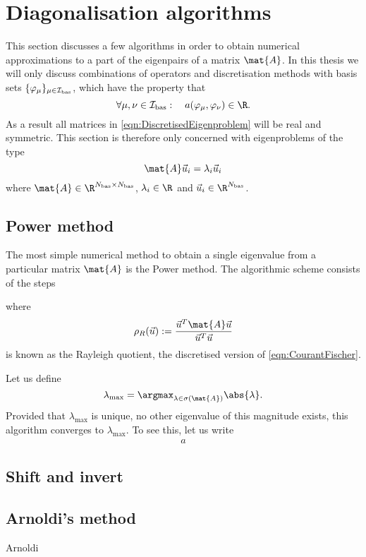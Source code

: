 \section{Diagonalisation algorithms}
\label{sec:DiagAlgos}

This section discusses a few algorithms in order to obtain
numerical approximations to a part of the eigenpairs of a matrix $\mat{A}$.
In this thesis we will only discuss combinations of operators
and discretisation methods with basis sets
$\{\varphi_\mu\}_{\mu \in \mathcal{I}_\text{bas}}$, which have the property that
\[ \forall \mu, \nu \in \Ibas: \quad a(\varphi_\mu, \varphi_\nu) \in \R. \]
As a result all matrices in \eqref{eqn:DiscretisedEigenproblem}
will be real and symmetric.
This section is therefore only concerned with eigenproblems of the type
\[ \mat{A} \vec{u}_i = \lambda_i \vec{u}_i \]
where $\mat{A} \in \R^{\Nbas \times \Nbas}$,
$\lambda_i \in \R$ and $\vec{u}_i \in \R^{\Nbas}$.

\subsection{Power method}
The most simple numerical method to obtain
a single eigenvalue from a particular matrix $\mat{A}$
is the Power method.
The algorithmic scheme consists of the steps


where
\[ \rho_R(\vec{u}) := \frac{\vec{u}^T \mat{A} \vec{u}}{\vec{u}^T \vec{u}} \]
is known as the Rayleigh quotient,
the discretised version of \eqref{eqn:CourantFischer}.

Let us define
\[ \lambda_\text{max} = \argmax_{\lambda \in \sigma(\mat{A})} \abs{\lambda}. \]
Provided that $\lambda_\text{max}$ is unique,
\ie no other eigenvalue of this magnitude exists,
this algorithm converges to $\lambda_\text{max}$.
To see this, let us write
\begin{align}
	a
\end{align}




\subsection{Shift and invert}
\label{sec:ShiftInvert}

\subsection{Arnoldi's method}
\label{sec:Arnoldi}
Arnoldi~\cite{Arnoldi1951}

